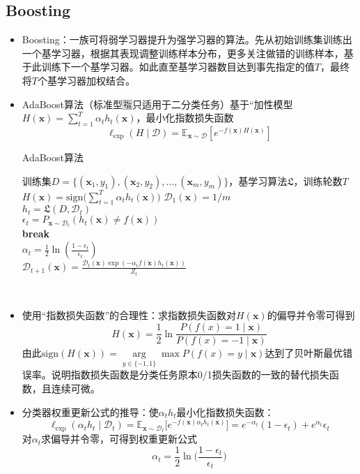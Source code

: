 \documentclass{ctexart}
\begin{document}
				\subsection{Boosting}
					\begin{itemize}
						\item Boosting：一族可将弱学习器提升为强学习器的算法。先从初始训练集训练出一个基学习器，根据其表现调整训练样本分布，更多关注做错的训练样本，基于此训练下一个基学习器。如此直至基学习器数目达到事先指定的值$T$，最终将$T$个基学习器加权结合。
						\item AdaBoost算法（标准型🈯只适用于二分类任务）基于``加性模型$H(\bm{x})=\sum_{t=1}^{T}\alpha_th_t(\bm{x})$，最小化指数损失函数\[\ell_{\mathrm{exp}}(H\mid\mathcal{D})=\mathbb{E}_{\bm{x}\sim\mathcal{D}}[e^{-f(\bm{x})H(\bm{x})}]\]\begin{algorithm}
							\caption{AdaBoost算法}
							\begin{algorithmic}[1]
								\REQUIRE 训练集$D=\{(\bm{x}_1,y_1),(\bm{x}_2,y_2),\dots,(\bm{x}_m,y_m)\}$，基学习算法$\mathfrak{L}$，训练轮数$T$
								\ENSURE $H(\bm{x})=\mathrm{sign}\big(\sum_{t=1}^{T}\alpha_th_t(\bm{x})\big)$
								\STATE $\mathcal{D}_1(\bm{x})=1/m$ \\
									\STATE $h_t=\mathfrak{L}(D,\mathcal{D}_t)$ \\
									\STATE $\epsilon_t = P_{\bm{x}\sim\mathcal{D}_t}(h_t(\bm{x})\neq f(\bm{x}))$ \\
										\STATE \textbf{break}\\
									\ENDIF
									\STATE $\alpha_t=\frac{1}{2}\ln(\frac{1-\epsilon_t}{\epsilon_t})$\\
									\STATE $\mathcal{D}_{t+1}(\bm{x})=\frac{\mathcal{D}_t(\bm{x})\exp(-\alpha_tf(\bm{x})h_t(\bm{x}))}{Z_t}$\\
								\ENDFOR
							\end{algorithmic} 
						\end{algorithm}
						\item 使用``指数损失函数''的合理性：求指数损失函数对$H(\bm{x})$的偏导并令零可得到\[H(\bm{x})=\frac{1}{2}\ln\frac{P(f(x)=1\mid\bm{x})}{P(f(x)=-1\mid\bm{x})}\]由此$\mathrm{sign}(H(\bm{x}))=\arg\limits_{y\in\{-1,1\}}\max P(f(x)=y\mid\bm{x})$达到了贝叶斯最优错误率。说明指数损失函数是分类任务原本0/1损失函数的一致的替代损失函数，且连续可微。
						\item 分类器权重更新公式的推导：使$\alpha_th_t$最小化指数损失函数：\[\ell_{\mathrm{exp}}(\alpha_th_t\mid\mathcal{D}_t)=\mathbb{E}_{\bm{x}\sim\mathcal{D}_t}\big[e^{-f(\bm{x})\alpha_th_t(\bm{x})}\big]=e^{-\alpha_t}(1-\epsilon_t)+e^{\alpha_t}\epsilon_t\]对$\alpha_t$求偏导并令零，可得到权重更新公式\[\alpha_t=\frac{1}{2}\ln\bigg(\frac{1-\epsilon_t}{\epsilon_t}\bigg)\]

\end{itemize}
\end{document}
